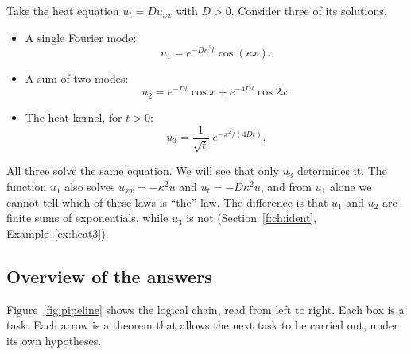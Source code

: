 \begin{example}
Take the heat equation $u_t=Du_{xx}$ with $D>0$. Consider three of its solutions.
\begin{itemize}
\item A single Fourier mode:
\[
u_1=e^{-D\kappa^2t}\cos(\kappa x).
\]
\item A sum of two modes:
\[
u_2=e^{-Dt}\cos x+e^{-4Dt}\cos 2x.
\]
\item The heat kernel, for $t>0$:
\[
u_3=\frac{1}{\sqrt{t}}\;e^{-x^2/(4Dt)}.
\]
\end{itemize}
All three solve the same equation. We will see that only $u_3$ determines it. The function $u_1$ also solves $u_{xx}=-\kappa^2u$ and $u_t=-D\kappa^2u$, and from $u_1$ alone we cannot tell which of these laws is ``the'' law. The difference is that $u_1$ and $u_2$ are finite sums of exponentials, while $u_3$ is not (Section~\ref{f:ch:ident}, Example~\ref{ex:heat3}).
\end{example}

\subsection{Overview of the answers}

Figure~\ref{fig:pipeline} shows the logical chain, read from left to right. Each box is a task. Each arrow is a theorem that allows the next task to be carried out, under its own hypotheses.

